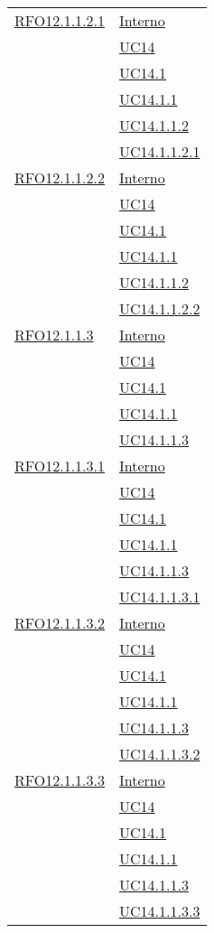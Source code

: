 \begin{longtable}{|>{\centering}m{5cm}|m{5cm}<{\centering}|}
 \hyperlink{RFO12.1.1.2.1}{RFO12.1.1.2.1} 
 & \hyperlink{Interno}{Interno}\\
& \hyperref[UC14]{UC14}\\
& \hyperref[UC14.1]{UC14.1}\\
& \hyperref[UC14.1.1]{UC14.1.1}\\
& \hyperref[UC14.1.1.2]{UC14.1.1.2}\\
& \hyperref[UC14.1.1.2.1]{UC14.1.1.2.1}\\\hline

\hyperlink{RFO12.1.1.2.2}{RFO12.1.1.2.2} 
 & \hyperlink{Interno}{Interno}\\
& \hyperref[UC14]{UC14}\\
& \hyperref[UC14.1]{UC14.1}\\
& \hyperref[UC14.1.1]{UC14.1.1}\\
& \hyperref[UC14.1.1.2]{UC14.1.1.2}\\
& \hyperref[UC14.1.1.2.2]{UC14.1.1.2.2}\\\hline

 \hyperlink{RFO12.1.1.3}{RFO12.1.1.3} 
 & \hyperlink{Interno}{Interno}\\
& \hyperref[UC14]{UC14}\\
& \hyperref[UC14.1]{UC14.1}\\
& \hyperref[UC14.1.1]{UC14.1.1}\\
& \hyperref[UC14.1.1.3]{UC14.1.1.3}\\\hline

 \hyperlink{RFO12.1.1.3.1}{RFO12.1.1.3.1} 
 & \hyperlink{Interno}{Interno}\\
& \hyperref[UC14]{UC14}\\
& \hyperref[UC14.1]{UC14.1}\\
& \hyperref[UC14.1.1]{UC14.1.1}\\
& \hyperref[UC14.1.1.3]{UC14.1.1.3}\\
& \hyperref[UC14.1.1.3.1]{UC14.1.1.3.1}\\\hline

 \hyperlink{RFO12.1.1.3.2}{RFO12.1.1.3.2} 
 & \hyperlink{Interno}{Interno}\\
& \hyperref[UC14]{UC14}\\
& \hyperref[UC14.1]{UC14.1}\\
& \hyperref[UC14.1.1]{UC14.1.1}\\
& \hyperref[UC14.1.1.3]{UC14.1.1.3}\\
& \hyperref[UC14.1.1.3.2]{UC14.1.1.3.2}\\\hline

 \hyperlink{RFO12.1.1.3.3}{RFO12.1.1.3.3} 
 & \hyperlink{Interno}{Interno}\\
& \hyperref[UC14]{UC14}\\
& \hyperref[UC14.1]{UC14.1}\\
& \hyperref[UC14.1.1]{UC14.1.1}\\
& \hyperref[UC14.1.1.3]{UC14.1.1.3}\\
& \hyperref[UC14.1.1.3.3]{UC14.1.1.3.3}\\\hline


\end{longtable}
